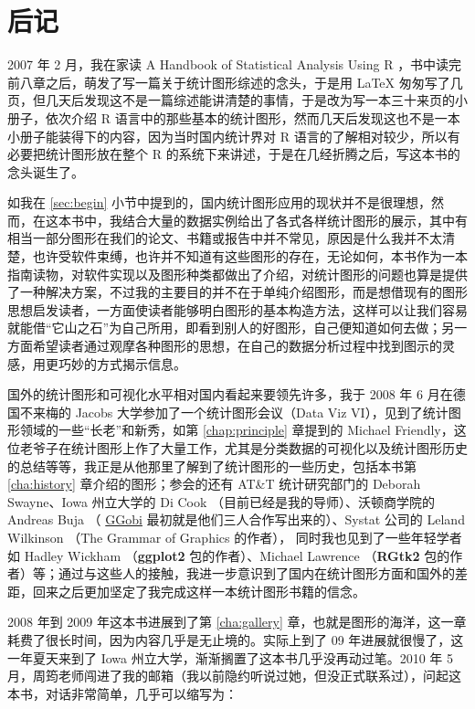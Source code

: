 \documentclass[
  b5paper,
  UTF8,twoside]{book}
\begin{document}
\chapter{后记}\label{postscript}

2007 年 2 月，我在家读 A Handbook of Statistical Analysis Using R \citep{Everitt06}，书中读完前八章之后，萌发了写一篇关于统计图形综述的念头，于是用 LaTeX 匆匆写了几页，但几天后发现这不是一篇综述能讲清楚的事情，于是改为写一本三十来页的小册子，依次介绍 R 语言中的那些基本的统计图形，然而几天后发现这也不是一本小册子能装得下的内容，因为当时国内统计界对 R 语言的了解相对较少，所以有必要把统计图形放在整个 R 的系统下来讲述，于是在几经折腾之后，写这本书的念头诞生了。

如我在 \ref{sec:begin} 小节中提到的，国内统计图形应用的现状并不是很理想，然而，在这本书中，我结合大量的数据实例给出了各式各样统计图形的展示，其中有相当一部分图形在我们的论文、书籍或报告中并不常见，原因是什么我并不太清楚，也许受软件束缚，也许并不知道有这些图形的存在，无论如何，本书作为一本指南读物，对软件实现以及图形种类都做出了介绍，对统计图形的问题也算是提供了一种解决方案，不过我的主要目的并不在于单纯介绍图形，而是想借现有的图形思想启发读者，一方面使读者能够明白图形的基本构造方法，这样可以让我们容易就能借``它山之石''为自己所用，即看到别人的好图形，自己便知道如何去做；另一方面希望读者通过观摩各种图形的思想，在自己的数据分析过程中找到图示的灵感，用更巧妙的方式揭示信息。

国外的统计图形和可视化水平相对国内看起来要领先许多，我于 2008 年 6 月在德国不来梅的 Jacobs 大学参加了一个统计图形会议（Data Viz VI），见到了统计图形领域的一些``长老''和新秀，如第 \ref{chap:principle} 章提到的 Michael Friendly，这位老爷子在统计图形上作了大量工作，尤其是分类数据的可视化以及统计图形历史的总结等等，我正是从他那里了解到了统计图形的一些历史，包括本书第 \ref{cha:history} 章介绍的图形；参会的还有 AT\&T 统计研究部门的 Deborah Swayne、Iowa 州立大学的 Di Cook （目前已经是我的导师）、沃顿商学院的 Andreas Buja （ \href{http://www.ggobi.org}{GGobi} 最初就是他们三人合作写出来的）、Systat 公司的 Leland Wilkinson （The Grammar of Graphics 的作者）， 同时我也见到了一些年轻学者如 Hadley Wickham （\textbf{ggplot2} 包的作者）、Michael Lawrence （\textbf{RGtk2} 包的作者）等；通过与这些人的接触，我进一步意识到了国内在统计图形方面和国外的差距，回来之后更加坚定了我完成这样一本统计图形书籍的信念。

2008 年到 2009 年这本书进展到了第 \ref{cha:gallery} 章，也就是图形的海洋，这一章耗费了很长时间，因为内容几乎是无止境的。实际上到了 09 年进展就很慢了，这一年夏天来到了 Iowa 州立大学，渐渐搁置了这本书几乎没再动过笔。2010 年 5 月，周筠老师闯进了我的邮箱（我以前隐约听说过她，但没正式联系过），问起这本书，对话非常简单，几乎可以缩写为：
\end{document}
